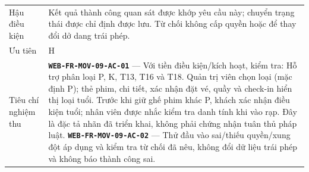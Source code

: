 \begin{longtable}{@{}P{0.23000\SRSWidth}P{0.77000\SRSWidth}@{}}
Hậu điều kiện & Kết quả thành công quan sát được khớp yêu cầu này; chuyển trạng thái được chỉ định được lưu. Từ chối không cấp quyền hoặc để thay đổi dở dang trái phép. \\[3pt]
Ưu tiên & H \\[3pt]
Tiêu chí nghiệm thu & \textbf{\texttt{WEB-\allowbreak{}FR-\allowbreak{}MOV-\allowbreak{}09-\allowbreak{}AC-\allowbreak{}01}} — Với tiền điều kiện/\allowbreak{}kích hoạt, kiểm tra: Hỗ trợ phân loại P, K, T13, T16 và T18. Quản trị viên chọn loại (mặc định P); thẻ phim, chi tiết, xác nhận đặt vé, quầy và check-in hiển thị loại tuổi. Trước khi giữ ghế phim khác P, khách xác nhận điều kiện tuổi; nhân viên được nhắc kiểm tra danh tính khi vào rạp. Đây là đặc tả nhãn đã triển khai, không phải chứng nhận tuân thủ pháp luật. \textbf{\texttt{WEB-\allowbreak{}FR-\allowbreak{}MOV-\allowbreak{}09-\allowbreak{}AC-\allowbreak{}02}} — Thử đầu vào sai/\allowbreak{}thiếu quyền/\allowbreak{}xung đột áp dụng và kiểm tra từ chối đã nêu, không đổi dữ liệu trái phép và không báo thành công sai. \\[3pt]

\end{longtable}
